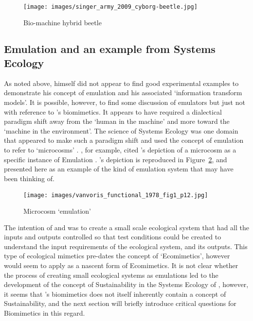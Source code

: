 \begin{figure}[H]
    \centering
    \texttt{[image: images/singer\_army\_2009\_cyborg-beetle.jpg]}
    \caption{Bio-machine hybrid beetle \citep{singer_army_2009}}
    \label{fig:singer:darpa}
\end{figure}

\subsection{Emulation and an example from Systems Ecology}

As noted above, \citeauthor{schmitt_signals_1963} himself did not appear to find good experimental examples to demonstrate his concept of emulation and his associated `information transform models'. It is possible, however, to find some discussion of emulators but just not with reference to \citeauthor{schmitt_signals_1963}'s biomimetics. It appears to have required a dialectical paradigm shift away from the `human in the machine' and more toward the `machine in the environment'. The science of Systems Ecology was one domain that appeared to make such a paradigm shift and used the concept of emulation to refer to `microcosms' \cite[p.~187]{beyers_ecological_1993}. \citeauthor{beyers_ecological_1993}, for example, cited \citeauthor{vanvoris_functional_1978}'s depiction of a microcosm as a specific instance of Emulation \cite[p.~238]{beyers_ecological_1993}. \citeauthor{vanvoris_functional_1978}'s depiction is reproduced in Figure~\ref{fig:vanvoris:1978:microcosm}, and presented here as an example of the kind of emulation system that \citeauthor{schmitt_signals_1963} may have been thinking of. 

\begin{figure}[H]
    \centering
    \texttt{[image: images/vanvoris\_functional\_1978\_fig1\_p12.jpg]}
    \caption{Microcosm `emulation' \cite[p.~12]{vanvoris_functional_1978}}
    \label{fig:vanvoris:1978:microcosm}
\end{figure}

The intention of \citeauthor{vanvoris_functional_1978} and \citeauthor{beyers_ecological_1993} was to create a small scale ecological system that had all the inputs and outputs controlled so that test conditions could be created to understand the input requirements of the ecological system, and its outputs. This type of ecological mimetics pre-dates the concept of `Ecomimetics', however would seem to apply as a nascent form of Ecomimetics. It is not clear whether the process of creating small ecological systems as emulations led to the development of the concept of Sustainability in the Systems Ecology of  \citeauthor{beyers_ecological_1993}, however, it seems that \citeauthor{schmitt_signals_1963}'s biomimetics does not itself inherently contain a concept of Sustainability, and the next section will briefly introduce critical questions for Biomimetics in this regard.


